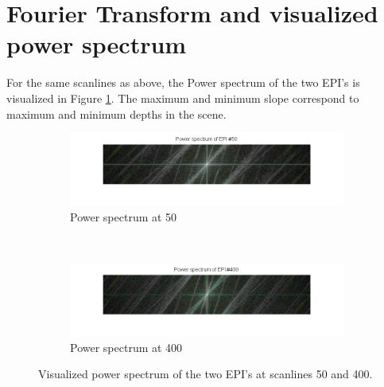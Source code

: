 \documentclass[a4paper]{article}
\begin{document}
\section*{Fourier Transform and visualized power spectrum}
For the same scanlines as above, the Power spectrum of the two EPI's is visualized in Figure \ref{fig:powerSpectrum}. The maximum and minimum slope correspond to maximum and minimum  depths in the scene.
\begin{figure}[ht]
	\vspace{2mm}
	\begin{subfigure}[h]{0.48\textwidth}
	  \includegraphics[width=\textwidth]{powerSpec50}
	  \caption*{Power spectrum at 50}
	\end{subfigure}
    	~
	\begin{subfigure}[h]{0.48\textwidth}
	  \centering
	  \includegraphics[width=\textwidth]{powerSpec400}
	  \caption*{Power spectrum at 400}
	\end{subfigure}
\caption{Visualized power spectrum of the two EPI's at scanlines 50 and 400.}
\label{fig:powerSpectrum}
\end{figure}
\end{document}
